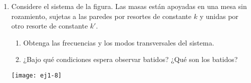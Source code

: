 \documentclass[11pt,spanish,a4paper]{article}
\begin{document}
\begin{enumerate}
\item \label{2masitas}
\begin{minipage}[t][2.8cm]{0.7\textwidth}
Considere el sistema de la figura. Las masas están apoyadas en una mesa sin rozamiento, sujetas a las paredes por resortes de constante
$k$ y unidas por otro resorte de constante $k'$.
\begin{enumerate}
	\item Obtenga las frecuencias y los modos transversales del sistema. 
	\item ¿Bajo qué condiciones espera observar batidos?
	¿Qué son los batidos?
\end{enumerate}
\end{minipage}
\begin{minipage}[c][0cm][t]{0.25\textwidth}
  \texttt{[image: ej1-8]}
\end{minipage}

								



\end{enumerate}
\end{document}

